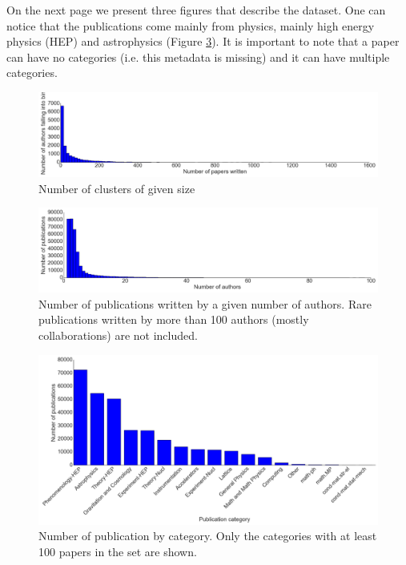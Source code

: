 \documentclass{pracamgr}
\begin{document}
On the next page we present three figures that describe the dataset. One can
notice that the publications come mainly from physics, mainly high energy physics
(HEP) and astrophysics (Figure \ref{fig:dat3}). It is important to note that
a paper can have no categories (i.e. this metadata is missing) and it can
have multiple categories.


\begin{figure}[!ht]
\includegraphics[width=\textwidth]{figures/counts}
\caption{Number of clusters of given size}
\label{fig:dat1}
\end{figure}


\begin{figure}[!ht]
\includegraphics[width=\textwidth]{figures/counts2}
\caption{Number of publications written by a given number of authors.
Rare publications written by more than 100 authors (mostly collaborations) are not included.}
\label{fig:dat2}
\end{figure}


\begin{figure}[!ht]
\includegraphics[width=\textwidth]{figures/topics}
\caption{Number of publication by category. Only the categories with at least
100 papers in the set are shown.}
\label{fig:dat3}
\end{figure}
\end{document}
